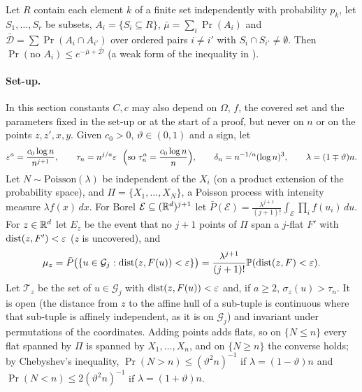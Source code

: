 \documentclass[11pt]{article}
\begin{document}
\begin{thmJ}
Let $R$ contain each element $k$ of a finite set independently with probability $p_k$, let $S_1, \dots, S_r$ be subsets,
$A_i = \{S_i \subseteq R\}$, $\bar\mu = \sum_i\Pr(A_i)$ and $\bar{\mathcal D} = \sum\Pr(A_i \cap A_{i'})$ over ordered pairs $i \ne i'$ with
$S_i \cap S_{i'} \ne \emptyset$. Then $\Pr(\text{no }A_i) \le e^{-\bar\mu+\bar{\mathcal D}}$ (a weak form of the inequality in \cite{AS}).
\end{thmJ}

\paragraph{Set-up.} In this section constants $C,c$ may also depend on $\Omega$, $f$, the covered set and the parameters fixed in
the set-up or at the start of a proof, but never on $n$ or on the points $z,z',x,y$. Given $c_0>0$, $\vartheta\in(0,1)$ and a sign,
let
\[
  \varepsilon^a=\frac{c_0\log n}{n^{j+1}},\qquad \tau_n=n^{j/a}\varepsilon\ \ \Bigl(\text{so }\tau_n^a=\frac{c_0\log n}n\Bigr),\qquad\delta_n=n^{-1/a}(\log n)^3,\qquad\lambda=(1\mp\vartheta)n.
\]
Let $N \sim \mathrm{Poisson}(\lambda)$ be independent of the $X_i$ (on a product extension of the probability space), and
$\Pi = \{X_1, \dots, X_N\}$, a Poisson process with intensity measure $\lambda f(x)\,dx$. For Borel $\mathcal E\subseteq(\mathbb{R}^d)^{j+1}$ let
$\bar P(\mathcal E)=\frac{\lambda^{j+1}}{(j+1)!}\int_{\mathcal E}\prod_if(u_i)\,du$. For $z\in\mathbb{R}^d$ let $E_z$ be the event that no $j+1$ points of $\Pi$
span a $j$-flat $F'$ with $\operatorname{dist}(z,F')<\varepsilon$ ($z$ is uncovered), and
\[
  \mu_z=\bar P\bigl(\{u\in\mathcal G_j:\operatorname{dist}(z,F(u))<\varepsilon\}\bigr)=\frac{\lambda^{j+1}}{(j+1)!}\mathbb{P}(\operatorname{dist}(z,F)<\varepsilon).
\]
Let $\mathcal T_z$ be the set of $u\in\mathcal G_j$ with $\operatorname{dist}(z,F(u))<\varepsilon$ and, if $a\ge2$, $\sigma_z(u)>\tau_n$. It is open (the distance
from $z$ to the affine hull of a sub-tuple is continuous where that sub-tuple is affinely independent, as it is on $\mathcal G_j$)
and invariant under permutations of the coordinates. Adding points adds flats, so on $\{N\le n\}$ every flat spanned by $\Pi$ is
spanned by $X_1,\dots,X_n$, and on $\{N\ge n\}$ the converse holds; by Chebyshev's inequality,
$\Pr(N>n)\le(\vartheta^2n)^{-1}$ if $\lambda=(1-\vartheta)n$ and $\Pr(N<n)\le2(\vartheta^2n)^{-1}$ if $\lambda=(1+\vartheta)n$.
\end{document}
